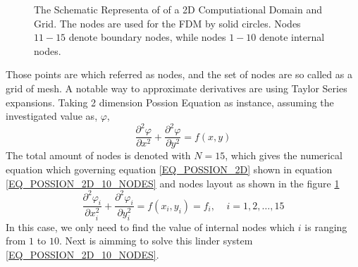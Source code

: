 \begin{figure}[htbp]
  \caption{The Schematic Representa of of a 2D Computiational Domain and Grid. The nodes are used for the FDM by solid circles. 
  Nodes $11-15$ denote boundary nodes, while nodes $1-10$ denote internal nodes.}
  \label{FIG_POSSION_2D_10_NODES}
\end{figure}
Those points are which referred as nodes, and the set of nodes 
are so called as a grid of mesh.
A notable way to approximate derivatives are using 
Taylor Series expansions.
Taking 2 dimension Possion Equation as instance, assuming the investigated value as, $\varphi$,
\begin{equation}\label{EQ_POSSION_2D}
  \frac{
    \partial ^ 2 \varphi  
  }{
    \partial x ^ 2
  } +
  \frac{
    \partial ^ 2 \varphi  
  }{
    \partial y ^ 2
  }
  =  f(x,y)
\end{equation}
The total amount of nodes is denoted with $N = 15$, which gives the numerical equation which governing 
equation \ref{EQ_POSSION_2D} 
shown in 
equation \ref{EQ_POSSION_2D_10_NODES} and nodes layout as shown in the 
figure \ref{FIG_POSSION_2D_10_NODES}
\begin{equation}\label{EQ_POSSION_2D_10_NODES}
  \frac{
    \partial ^ 2 \varphi_i
  }{
    \partial x_i ^ 2
  } +
  \frac{
    \partial ^ 2 \varphi_i
  }{
    \partial y_i ^ 2
  }
  =  f(x_i,y_i) = f_i, \:\:\:\:\: i = 1,2,\dots,15
\end{equation}
In this case, we only need to find the value of internal nodes which $i$ is ranging from $1$ to $10$.
Next is aimming to solve this linder system \ref{EQ_POSSION_2D_10_NODES}.


